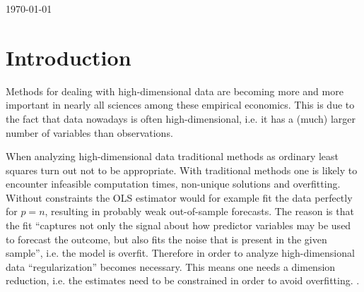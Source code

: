 \documentclass{article}
\theoremstyle{definition}
\begin{document}
\begin{titlepage}
	
	
	\vfill\vfill\vfill %
	
	{\large\today} %
	
	
	 
	
	\vfill %
	
\end{titlepage} \newpage


\tableofcontents \newpage


\listoffigures \newpage


\listoftables \newpage



\section{Introduction}
Methods for dealing with high-dimensional data are becoming more and more important in nearly all sciences among these empirical economics. This is due to the fact that data nowadays is often high-dimensional, i.e. it has a (much) larger number of variables than observations.

When analyzing high-dimensional data traditional methods as ordinary least squares turn out not to be appropriate. With traditional methods one is likely to encounter infeasible computation times, non-unique solutions and overfitting. Without constraints the OLS estimator would for example fit the data perfectly for $p=n$, resulting in probably weak out-of-sample forecasts. The reason is that the fit “captures not only the signal about how predictor variables may be used to forecast the outcome, but also fits the noise that is present in the given sample”, i.e. the model is overfit.
Therefore in order to analyze high-dimensional data “regularization” becomes necessary. This means one needs a dimension reduction, i.e. the estimates need to be constrained in order to avoid overfitting.  \citep{belloni2014}.
\end{document}
